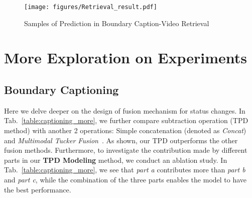 \documentclass[runningheads]{llncs}
\begin{document}
\begin{figure}[t]
\centering
\texttt{[image: figures/Retrieval\_result.pdf]}
\vspace{-0.9cm}
\setlength{\abovecaptionskip}{0.9cm}
\caption{Samples of Prediction in Boundary Caption-Video Retrieval}
\label{fig:retrieval_res}
\end{figure} \section{More Exploration on Experiments}
\label{supp-sec:more_experiments}

\subsection{Boundary Captioning}
Here we delve deeper on the design of fusion mechanism for status changes. In Tab.~\ref{table:captioning_more}, we further compare subtraction operation (TPD method) with another 2 operations: 
Simple concatenation (denoted as \textit{Concat}) and \textit{Multimodal Tucker Fusion}~\cite{ben2017mutan}.
As shown, our TPD outperforms the other fusion methods. Furthermore, to investigate the contribution made by different parts in our \textbf{TPD Modeling} method, we conduct an ablation study. In Tab.~\ref{table:captioning_more}, we see that \textit{part a} contributes more than \textit{part b} and \textit{part c}, while the combination of the three parts enables the model to have the best performance.
\end{document}
